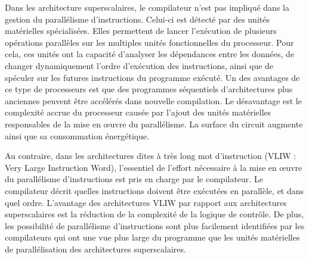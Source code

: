 Dans les architecture superscalaires, le compilateur n'est pas impliqué dans la gestion du parallélisme d'instructions. Celui-ci est détecté par des unités matérielles spécialisées. 
Elles permettent de lancer l'exécution de plusieurs opérations parallèles sur les multiples unités fonctionnelles du processeur.
Pour cela, ces unités ont la capacité d'analyser les dépendances entre les données, de changer dynamiquement l'ordre d'exécution des instructions, ainsi que de spéculer sur les futures instructions du programme exécuté. 
Un des avantages de ce type de processeurs est que des programmes séquentiels d'architectures plus anciennes peuvent être accélérés dans nouvelle compilation. Le désavantage est le complexité accrue du processeur causée par l'ajout des unités matérielles responsables de la mise en œuvre du parallélisme. La surface du circuit augmente ainsi que sa consommation énergétique.

Au contraire, dans les architectures dites \og à très long mot d'instruction \fg (VLIW : Very Large Instruction Word), l'essentiel de l'effort nécessaire à la mise en œuvre du parallélisme d'instructions est pris en charge par le compilateur. Le compilateur décrit quelles instructions doivent être exécutées en parallèle, et dans quel ordre. L'avantage des architectures VLIW par rapport aux architectures superscalaires est la réduction de la complexité de la logique de contrôle. De plus, les possibilité de parallélisme d'instructions sont plus facilement identifiées par les compilateurs qui ont une vue plus large du programme que les unités matérielles de parallélisation des architectures superscalaires.


